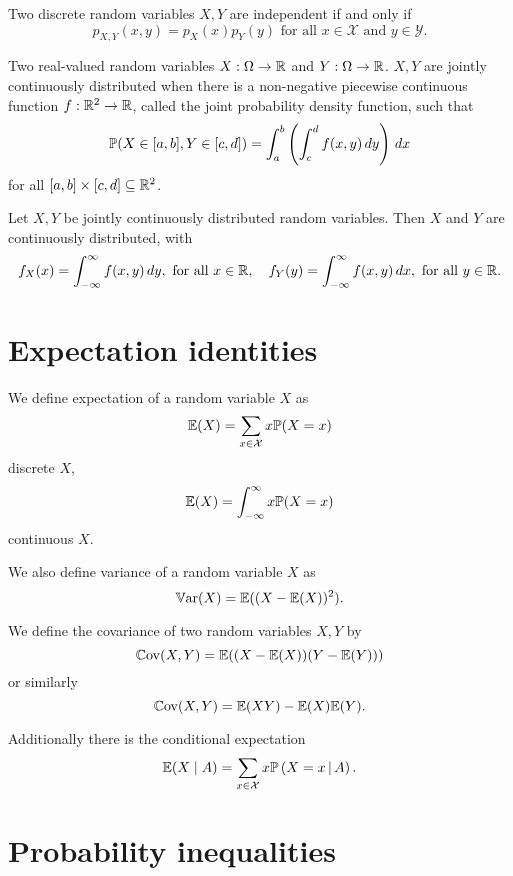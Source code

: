 \documentclass[10pt, a4paper]{article}
\begin{document}
\begin{lemma}
    Two discrete random variables $X, Y$ are independent if and only if
    \[
    p_{X, Y}(x, y) = p_X(x)p_Y(y)\text{ for all $x \in \mathcal{X}$ and $y \in \mathcal{Y}$.}
    \]
\end{lemma}

\begin{definition}
    Two real-valued random variables $X : \Omega \to \R$ and $Y : \Omega \to \R$.
    $X, Y$ are jointly continuously distributed when there is a non-negative piecewise continuous function $f : \R ^ 2 \to \R$,
    called the joint probability density function,
    such that
    \[
    \P(X \in [a, b], Y \in [c, d]) = \int_{a}^{b}\left(\int_{c}^{d}f(x, y)\,dy\right)\,dx
    \]
    for all $[a, b] \times [c, d] \subseteq \R ^ 2$.
\end{definition}

\begin{corollary}
    Let $X, Y$ be jointly continuously distributed random variables.
    Then $X$ and $Y$ are continuously distributed,
    with
    \[
    f_X(x) = \int_{-\infty}^{\infty}f(x, y)\,dy,\text{ for all $x \in \R$},\quad f_Y(y) = \int_{-\infty}^{\infty}f(x, y)\,dx,\text{ for all $y \in \R$}.
    \]
\end{corollary}

\newpage

\section{Expectation identities}

We define expectation of a random variable $X$ as
\[
\E(X) = \sum_{x \in \mathcal{X}}x\P(X = x)
\]
discrete $X$,
\[
\E(X) = \int_{-\infty}^{\infty}x\P(X = x)
\]
continuous $X$.

We also define variance of a random variable $X$ as
\[
\Var(X) = \E((X - \E(X)) ^ 2).
\]

We define the covariance of two random variables $X, Y$ by
\[
\Cov(X, Y) = \E((X - \E(X))(Y - \E(Y)))
\]
or similarly
\[
\Cov(X, Y) = \E(XY) - \E(X)\E(Y).
\]

Additionally there is the conditional expectation
\[
\E(X\mid A) = \sum_{x \in \mathcal{X}}x\cP{X = x}{A}.
\]

\newpage

\section{Probability inequalities}
\end{document}
